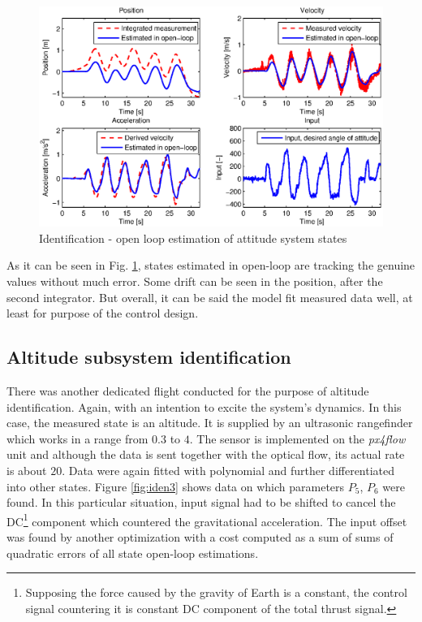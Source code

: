 \begin{figure}[h]
\includegraphics[width=1\textwidth]{fig/iden2.eps} 
\caption{Identification - open loop estimation of attitude system states}
\label{fig:iden2}
\end{figure}

As it can be seen in Fig. \ref{fig:iden2}, states estimated in open-loop are tracking the genuine values without much error. Some drift can be seen in the position, after the second integrator. But overall, it can be said the model fit measured data well, at least for purpose of the control design. 

\subsection{Altitude subsystem identification}

There was another dedicated flight conducted for the purpose of altitude identification. Again, with an intention to excite the system's dynamics. In this case, the measured state is an altitude. It is supplied by an ultrasonic rangefinder which works in a range from $0.3$ to $4$. The sensor is implemented on the \emph{px4flow} unit and although the data is sent together with the optical flow, its actual rate is about $20$. Data were again fitted with polynomial and further differentiated into other states. Figure \ref{fig:iden3} shows data on which parameters $P_5$, $P_6$ were found. In this particular situation, input signal had to be shifted to cancel the DC\footnote{Supposing the force caused by the gravity of Earth is a constant, the control signal countering it is constant DC component of the total thrust signal.} component which countered the gravitational acceleration. The input offset was found by another optimization with a cost computed as a sum of sums of quadratic errors of all state open-loop estimations.

